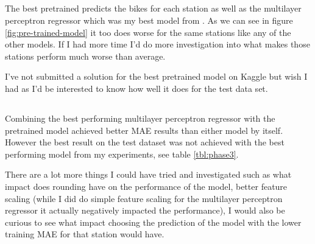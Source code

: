 \documentclass[a4paper]{article}
\begin{document}
    \subsection*{}
    The best pretrained predicts the bikes for each station as well as the multilayer perceptron regressor
    which was my best model from .
    As we can see in figure \ref{fig:pre-trained-model} it too does worse for the same stations like any of the other models.
    If I had more time I'd do more investigation into what makes those stations perform much worse than average.

    I've not submitted a solution for the best pretrained model on Kaggle but wish I had as I'd be interested to know how
    well it does for the test data set.

    \subsection*{}
    Combining the best performing multilayer perceptron regressor with the pretrained model achieved better MAE results than
    either model by itself. However the best result on the test dataset was not achieved with the best performing model
    from my experiments,
    see table \ref{tbl:phase3}.

    There are a lot more things I could have tried and investigated such as what impact does rounding have on the performance
    of the model, better feature scaling (while I did do simple feature scaling for the multilayer perceptron regressor it actually
    negatively impacted the performance), I would also be curious to see what impact choosing the prediction of the model
    with the lower training MAE for that station would have.

    
    
\end{document}
